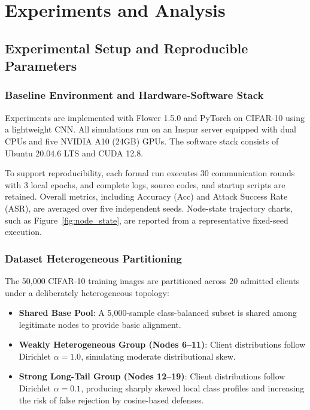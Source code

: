 \documentclass[final,5p,times,twocolumn]{elsarticle/elsarticle}
\newenvironment{tightitemize}{%
  \begin{itemize}\setlength{\itemsep}{1pt}\setlength{\parskip}{0pt}\setlength{\parsep}{0pt}}{\end{itemize}}
\begin{document}
\section{Experiments and Analysis}
\label{sec:experiments}
\subsection{Experimental Setup and Reproducible Parameters}
\subsubsection{Baseline Environment and Hardware-Software Stack}
Experiments are implemented with Flower 1.5.0 and PyTorch on CIFAR-10 using a lightweight CNN. All simulations run on an Inspur server equipped with dual CPUs and five NVIDIA A10 (24GB) GPUs. The software stack consists of Ubuntu 20.04.6 LTS and CUDA 12.8.

To support reproducibility, each formal run executes 30 communication rounds with 3 local epochs, and complete logs, source codes, and startup scripts are retained. Overall metrics, including Accuracy (Acc) and Attack Success Rate (ASR), are averaged over five independent seeds. Node-state trajectory charts, such as Figure~\ref{fig:node_state}, are reported from a representative fixed-seed execution.

\subsubsection{Dataset Heterogeneous Partitioning}
The 50,000 CIFAR-10 training images are partitioned across 20 admitted clients under a deliberately heterogeneous topology:
\begin{tightitemize}
    \item \textbf{Shared Base Pool}: A 5,000-sample class-balanced subset is shared among legitimate nodes to provide basic alignment.
    \item \textbf{Weakly Heterogeneous Group (Nodes 6--11)}: Client distributions follow Dirichlet $\alpha=1.0$, simulating moderate distributional skew.
    \item \textbf{Strong Long-Tail Group (Nodes 12--19)}: Client distributions follow Dirichlet $\alpha=0.1$, producing sharply skewed local class profiles and increasing the risk of false rejection by cosine-based defenses.
\end{tightitemize}
\end{document}
